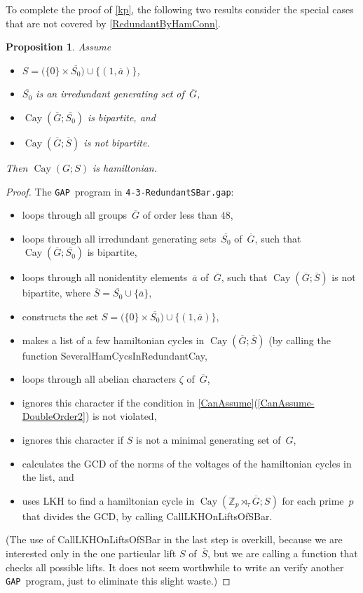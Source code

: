 \documentclass[]{amcjoucc}
\newcommand{\pref}[1]{(\ref{#1})}
\newcommand{\fullcref}[2]{\cref{#1}\pref{#1-#2}}
\theoremstyle{plain}
\newtheorem{prop}[equation]{Proposition}
\theoremstyle{definition}
\theoremstyle{definition}
\newenvironment{justification}{\begingroup \renewcommand{\proofname}{Justification}\begin{proof}}{\end{proof}\endgroup}
\DeclareMathOperator{\Cay}{Cay}
\newcommand{\quot}{\overline}
\newcommand{\GAP}{\filename{GAP}}
\newcommand{\ZZ}{\mathbb{Z}}
\newcommand{\filename}[1]{\texttt{#1}}
\newcommand{\function}[1]{\textsf{#1}}
\begin{document}
To complete the proof of \cref{kp}, the following two results consider the special cases that are not covered by \cref{RedundantByHamConn}.

\begin{prop} \label{BipAndNonbip}
Assume 
	\begin{itemize}
	\item $S = \bigl( \{ 0 \}\times \quot{S_0} \bigr) \cup \{ (1,\quot a) \}$, 
	\item $\quot{S_0}$ is an irredundant generating set of~$\quot G$, 
	\item $\Cay(\quot G; \quot{S_0})$ is bipartite,
	and 
	\item $\Cay(\quot G; \quot{S})$ is not bipartite.
	\end{itemize}
Then $\Cay(G;S)$ is hamiltonian.
\end{prop}

\begin{justification}
The \GAP\ program in \filename{4-3-RedundantSBar.gap}:
	\begin{itemize}
	\item loops through all groups~$\quot G$ of order less than $48$,
	\item loops through all irredundant generating sets~$\quot{S_0}$ of~$\quot G$, such that $\Cay(\quot G; \quot{S_0})$ is bipartite,
	\item loops through all nonidentity elements~$\quot a$ of~$\quot G$, such that $\Cay(\quot G; \quot S)$ is not bipartite, where $\quot S = \quot{S_0} \cup \{\quot a \}$,
	\item constructs the set $S = \bigl( \{0\} \times \quot{S_0} \bigr) \cup \{(1, \quot a)\}$,
	\item makes a list of a few hamiltonian cycles in $\Cay(\quot G; \quot S)$ (by calling the function \function{SeveralHamCycsInRedundantCay},
	\item loops through all abelian characters $\zeta$ of~$\quot G$,
	\item ignores this character if the condition in \fullcref{CanAssume}{DoubleOrder2} is not violated,
	\item ignores this character if $S$ is not a minimal generating set of~$G$,
	\item calculates the GCD of the norms of the voltages of the hamiltonian cycles in the list,
	and
	\item uses \function{LKH} to find a hamiltonian cycle in $\Cay(\ZZ_p \rtimes_\tau \quot G; S)$ for each prime~$p$ that divides the GCD, by calling \function{CallLKHOnLiftsOfSBar}. 
	\end{itemize}
(The use of \function{CallLKHOnLiftsOfSBar} in the last step is overkill, because we are interested only in the one particular lift $S$ of~$\quot S$, but we are calling a function that checks all possible lifts. It does not seem worthwhile to write an verify another \GAP\ program, just to eliminate this slight waste.)	
\end{justification}
\end{document}
